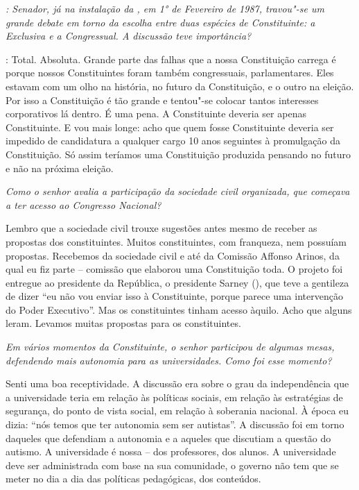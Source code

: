 \emph{: Senador, já na
instalação da , em 1° de Fevereiro de 1987,
travou"-se um grande debate em torno da escolha entre duas espécies de
Constituinte: a Exclusiva e a Congressual. A discussão teve
importância?}

: Total. Absoluta. Grande parte das falhas que a nossa
Constituição carrega é porque nossos Constituintes foram também
congressuais, parlamentares. Eles estavam com um olho na história, no
futuro da Constituição, e o outro na eleição. Por isso a Constituição é
tão grande e tentou"-se colocar tantos interesses corporativos lá dentro.
É uma pena. A Constituinte deveria ser apenas Constituinte. E vou mais
longe: acho que quem fosse Constituinte deveria ser impedido de
candidatura a qualquer cargo 10 anos seguintes à promulgação da
Constituição. Só assim teríamos uma Constituição produzida pensando no
futuro e não na próxima eleição.

\medskip

\noindent\emph{Como o senhor avalia a participação da sociedade civil organizada, que
começava a ter acesso ao Congresso Nacional?}

Lembro que a sociedade civil trouxe sugestões antes
mesmo de receber as propostas dos constituintes. Muitos constituintes,
com franqueza, nem possuíam propostas. Recebemos da sociedade civil e
até da Comissão Affonso Arinos, da qual eu fiz parte -- comissão que
elaborou uma Constituição toda. O projeto foi entregue ao presidente da
República, o presidente Sarney (), que teve a gentileza de dizer
``eu não vou enviar isso à Constituinte, porque parece uma intervenção
do Poder Executivo''. Mas os constituintes tinham acesso àquilo. Acho
que alguns leram. Levamos muitas propostas para os constituintes.

\medskip

\noindent\emph{Em vários momentos da Constituinte, o senhor participou de
algumas mesas, defendendo mais autonomia para as universidades. Como foi
esse momento?}

Senti uma boa receptividade. A discussão era sobre o
grau da independência que a universidade teria em relação às políticas
sociais, em relação às estratégias de segurança, do ponto de vista
social, em relação à soberania nacional. À época eu dizia: ``nós temos
que ter autonomia sem ser autistas''. A discussão foi em torno daqueles
que defendiam a autonomia e a aqueles que discutiam a questão do
autismo. A universidade é nossa -- dos professores, dos alunos. A
universidade deve ser administrada com base na sua comunidade, o governo
não tem que se meter no dia a dia das políticas pedagógicas, dos
conteúdos.

